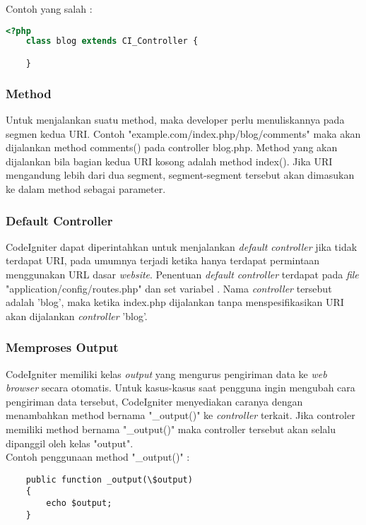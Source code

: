 Contoh yang salah :
\begin{lstlisting}[language=PHP]
	<?php
	class blog extends CI_Controller {

	}
\end{lstlisting}
	\subsubsection{Method}
	Untuk menjalankan suatu method, maka developer perlu menuliskannya pada segmen kedua URI. Contoh "example.com/index.php/blog/comments" maka akan dijalankan method comments() pada controller blog.php. Method yang akan dijalankan bila bagian kedua URI kosong adalah method index(). Jika URI mengandung lebih dari dua segment, segment-segment tersebut akan dimasukan ke dalam method sebagai parameter.
	
	\subsubsection{Default Controller}
	CodeIgniter dapat diperintahkan untuk menjalankan \textit{default controller} jika tidak terdapat URI, pada umumnya terjadi ketika hanya terdapat permintaan menggunakan URL dasar \textit{website}. Penentuan \textit{default controller} terdapat pada \textit{file} "application/config/routes.php" dan set variabel . Nama \textit{controller} tersebut adalah 'blog', maka ketika index.php dijalankan tanpa menspesifikasikan URI akan dijalankan \textit{controller} 'blog'.
	
	\subsubsection{Memproses Output}
	CodeIgniter memiliki kelas \textit{output} yang mengurus pengiriman data ke \textit{web browser} secara otomatis. Untuk kasus-kasus saat pengguna ingin mengubah cara pengiriman data tersebut, CodeIgniter menyediakan caranya dengan menambahkan method bernama "\_output()" ke \textit{controller} terkait. Jika controler memiliki method bernama "\_output()" maka controller tersebut akan  selalu dipanggil oleh kelas "output".\\
Contoh penggunaan method "\_output()" : 
\begin{lstlisting}
	public function _output(\$output)
	{
        echo $output;
	}
\end{lstlisting}

